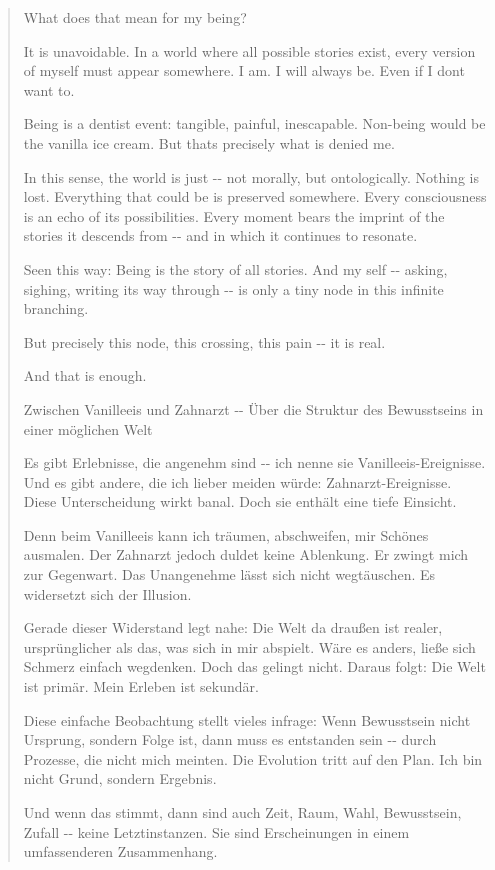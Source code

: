 \documentclass[
  ngerman,
]{article}
\begin{document}
\begin{quote}
What does that mean for my being?

It is unavoidable. In a world where all possible stories exist, every
version of myself must appear somewhere. I am. I will always be. Even if
I don\textquotesingle t want to.

Being is a dentist event: tangible, painful, inescapable. Non-being
would be the vanilla ice cream. But that\textquotesingle s precisely
what is denied me.

In this sense, the world is just -\/- not morally, but ontologically.
Nothing is lost. Everything that could be is preserved somewhere. Every
consciousness is an echo of its possibilities. Every moment bears the
imprint of the stories it descends from -\/- and in which it continues
to resonate.

Seen this way: Being is the story of all stories. And my self -\/-
asking, sighing, writing its way through -\/- is only a tiny node in
this infinite branching.

But precisely this node, this crossing, this pain -\/- it is real.

And that is enough.

Zwischen Vanilleeis und Zahnarzt -\/- Über die Struktur des Bewusstseins
in einer möglichen Welt

Es gibt Erlebnisse, die angenehm sind -\/- ich nenne sie
Vanilleeis-Ereignisse. Und es gibt andere, die ich lieber meiden würde:
Zahnarzt-Ereignisse. Diese Unterscheidung wirkt banal. Doch sie enthält
eine tiefe Einsicht.

Denn beim Vanilleeis kann ich träumen, abschweifen, mir Schönes
ausmalen. Der Zahnarzt jedoch duldet keine Ablenkung. Er zwingt mich zur
Gegenwart. Das Unangenehme lässt sich nicht wegtäuschen. Es widersetzt
sich der Illusion.

Gerade dieser Widerstand legt nahe: Die Welt da draußen ist realer,
ursprünglicher als das, was sich in mir abspielt. Wäre es anders, ließe
sich Schmerz einfach wegdenken. Doch das gelingt nicht. Daraus folgt:
Die Welt ist primär. Mein Erleben ist sekundär.

Diese einfache Beobachtung stellt vieles infrage: Wenn Bewusstsein nicht
Ursprung, sondern Folge ist, dann muss es entstanden sein -\/- durch
Prozesse, die nicht mich meinten. Die Evolution tritt auf den Plan. Ich
bin nicht Grund, sondern Ergebnis.

Und wenn das stimmt, dann sind auch Zeit, Raum, Wahl, Bewusstsein,
Zufall -\/- keine Letztinstanzen. Sie sind Erscheinungen in einem
umfassenderen Zusammenhang.


\end{quote}
\end{document}
